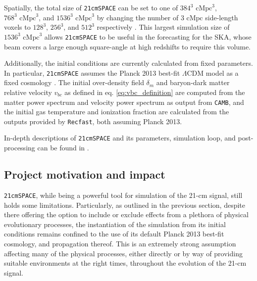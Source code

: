 \documentclass[floats,floatfix,showpacs,amssymb,prd,superscriptaddress,nofootinbib, 11pt]{revtex4-2} %
\newcommand{\code}{\texttt}
\begin{document}
Spatially, the total size of \code{21cmSPACE} can be set to one of $384^3 \text{ cMpc}^3$, $768^3 \text{ cMpc}^3$, and $1536^3 \text{ cMpc}^3$ by changing the number of $3 \text{ cMpc}$ side-length voxels to $128^3$, $256^3$, and $512^3$ respectively \citep{dhandha_2022}. This largest simulation size of $1536^3 \text{ cMpc}^3$ allows \code{21cmSPACE} to be useful in the forecasting for the SKA, whose beam covers a large enough square-angle at high redshifts to require this volume. 

Additionally, the initial conditions are currently calculated from fixed parameters. In particular, \code{21cmSPACE} assumes the Planck 2013 best-fit $\Lambda$CDM model as a fixed cosmology \citep{Planck2013results}. The initial over-density field $\delta_m$ and baryon-dark matter relative velocity $v_{bc}$ as defined in eq. \ref{eq:vbc_definition} are computed \citep{Fialkov_2012} from the matter power spectrum and velocity power spectrum as output from \code{CAMB}, and the initial gas temperature and ionization fraction are calculated from the outputs provided by \code{Recfast}, both assuming Planck 2013.

In-depth descriptions of \code{21cmSPACE} and its parameters, simulation loop, and post-processing can be found in \citet{Gessey-Jones_2023, Gessey-Jones_2024, gessey-jones_thesis}.

\subsection{Project motivation and impact}

\code{21cmSPACE}, while being a powerful tool for simulation of the 21-cm signal, still holds some limitations. Particularly, as outlined in the previous section, despite there offering the option to include or exclude effects from a plethora of physical evolutionary processes, the instantiation of the simulation from its initial conditions remains confined to the use of its default Planck 2013 best-fit cosmology, and propagation thereof. This is an extremely strong assumption affecting many of the physical processes, either directly or by way of providing suitable environments at the right times, throughout the evolution of the 21-cm signal.
\end{document}
